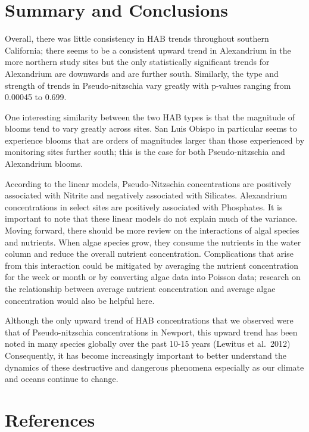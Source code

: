 \documentclass[
  12pt,
]{article}
\begin{document}
\newpage

\hypertarget{summary-and-conclusions}{%
\section{Summary and Conclusions}\label{summary-and-conclusions}}

Overall, there was little consistency in HAB trends throughout southern
California; there seems to be a consistent upward trend in Alexandrium
in the more northern study sites but the only statistically significant
trends for Alexandrium are downwards and are further south. Similarly,
the type and strength of trends in Pseudo-nitzschia vary greatly with
p-values ranging from 0.00045 to 0.699.

One interesting similarity between the two HAB types is that the
magnitude of blooms tend to vary greatly across sites. San Luis Obispo
in particular seems to experience blooms that are orders of magnitudes
larger than those experienced by monitoring sites further south; this is
the case for both Pseudo-nitzschia and Alexandrium blooms.

According to the linear models, Pseudo-Nitzschia concentrations are
positively associated with Nitrite and negatively associated with
Silicates. Alexandrium concentrations in select sites are positively
associated with Phosphates. It is important to note that these linear
models do not explain much of the variance. Moving forward, there should
be more review on the interactions of algal species and nutrients. When
algae species grow, they consume the nutrients in the water column and
reduce the overall nutrient concentration. Complications that arise from
this interaction could be mitigated by averaging the nutrient
concentration for the week or month or by converting algae data into
Poisson data; research on the relationship between average nutrient
concentration and average algae concentration would also be helpful
here.

Although the only upward trend of HAB concentrations that we observed
were that of Pseudo-nitzschia concentrations in Newport, this upward
trend has been noted in many species globally over the past 10-15 years
(Lewitus et al.~2012) Consequently, it has become increasingly important
to better understand the dynamics of these destructive and dangerous
phenomena especially as our climate and oceans continue to change.

\newpage

\hypertarget{references}{%
\section{References}\label{references}}
\end{document}
